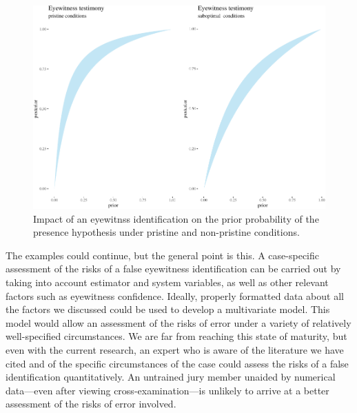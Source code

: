 \documentclass[
  10pt,
  dvipsnames,enabledeprecatedfontcommands]{scrartcl}
\begin{document}
\begin{figure}[h]

\begin{center}\includegraphics[width=1\linewidth]{lr-chapter4_files/figure-latex/eyewitness2b-1} \end{center}
\caption{Impact of an eyewitnss identification on the prior probability of the presence hypothesis under pristine and non-pristine conditions.}
\label{fig:eyewitness3b}
\end{figure}

\vspace{1mm}
\footnotesize

\normalsize

The examples could continue, but the general point is this. A
case-specific assessment of the risks of a false eyewitness
identification can be carried out by taking into account estimator and
system variables, as well as other relevant factors such as eyewitness
confidence. Ideally, properly formatted data about all the factors we
discussed could be used to develop a multivariate model. This model
would allow an assessment of the risks of error under a variety of
relatively well-specified circumstances. We are far from reaching this
state of maturity, but even with the current research, an expert who is
aware of the literature we have cited and of the specific circumstances
of the case could assess the risks of a false identification
quantitatively. An untrained jury member unaided by numerical
data---even after viewing cross-examination---is unlikely to arrive at a
better assessment of the risks of error involved.
\end{document}
